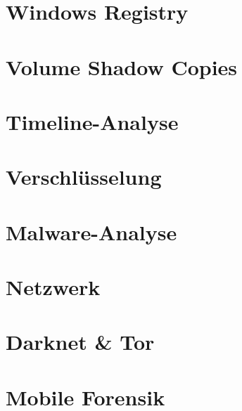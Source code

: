 \documentclass[
	fontsize=12pt,
	paper=a4,
	numbers=noenddot,
	listof=totoc,
	listof=entryprefix,
	listof=nochaptergap,
	bibliography=totoc,
	parskip=half,
	openany
]{scrbook}
\begin{document}
{\let\cleardoublepage\relax \chapter{Windows Registry}}

\newpage

{\let\cleardoublepage\relax \chapter{Volume Shadow Copies}}

\newpage

{\let\cleardoublepage\relax \chapter{Timeline-Analyse}}

\newpage

{\let\cleardoublepage\relax \chapter{Verschlüsselung}}

\newpage

{\let\cleardoublepage\relax \chapter{Malware-Analyse}}

\newpage

{\let\cleardoublepage\relax \chapter{Netzwerk}}

\newpage

{\let\cleardoublepage\relax \chapter{Darknet \& Tor}}

\newpage

{\let\cleardoublepage\relax \chapter{Mobile Forensik}}

\end{document}
